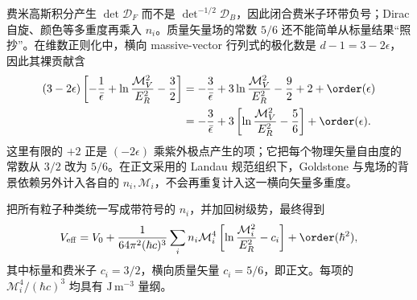 \begin{derivation}
费米高斯积分产生 $\det\mathcal D_F$ 而不是 $\det^{-1/2}\mathcal D_B$，因此闭合费米子环带负号；Dirac 自旋、颜色等多重度再乘入 $n_i$。质量矢量场的常数 $5/6$ 还不能简单从标量结果“照抄”。在维数正则化中，横向 massive-vector 行列式的极化数是 $d-1=3-2\epsilon$，因此其裸贡献含
\begin{align*}
 (3-2\epsilon)
 \left[-\frac1{\bar\epsilon}
 +\ln\frac{\mathcal M_V^2}{E_R^2}-\frac32\right]
 &=-\frac3{\bar\epsilon}
 +3\ln\frac{\mathcal M_V^2}{E_R^2}
 -\frac92+2+\order(\epsilon)\\
 &=-\frac3{\bar\epsilon}
 +3\left[
 \ln\frac{\mathcal M_V^2}{E_R^2}-\frac56
 \right]+\order(\epsilon).
\end{align*}
这里有限的 $+2$ 正是 $(-2\epsilon)$ 乘紫外极点产生的项；它把每个物理矢量自由度的常数从 $3/2$ 改为 $5/6$。在正文采用的 Landau 规范组织下，Goldstone 与鬼场的背景依赖另外计入各自的 $n_i,\mathcal M_i$，不会再重复计入这一横向矢量多重度。

把所有粒子种类统一写成带符号的 $n_i$，并加回树级势，最终得到
\begin{equation*}
 V_{\rm eff}=V_0+\frac1{64\pi^2(\hbar c)^3}
 \sum_i n_i\mathcal M_i^4
 \left[\ln\frac{\mathcal M_i^2}{E_R^2}-c_i\right]
 +\order(\hbar^2),
\end{equation*}
其中标量和费米子 $c_i=3/2$，横向质量矢量 $c_i=5/6$，即正文。每项的 $\mathcal M_i^4/(\hbar c)^3$ 均具有 $\mathrm{J\,m^{-3}}$ 量纲。
\end{derivation}

